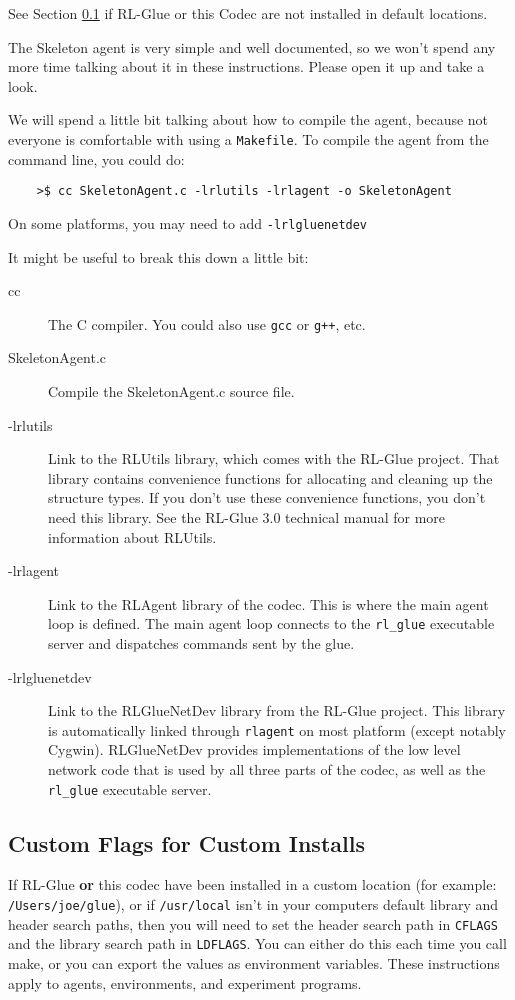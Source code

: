 \documentclass[11pt]{article}
\begin{document}
See Section \ref{sec:custom-flags} if RL-Glue or this Codec are not installed in default locations.

The Skeleton agent is very simple and well documented, so we won't spend any more time talking about it in these instructions.
Please open it up and take a look.

We will spend a little bit talking about how to compile the agent, because not everyone is comfortable with using a \texttt{Makefile}.  To compile
the agent from the command line, you could do:
\begin{verbatim}
	>$ cc SkeletonAgent.c -lrlutils -lrlagent -o SkeletonAgent
\end{verbatim}

On some platforms, you may need to add \texttt{-lrlgluenetdev}

It might be useful to break this down a little bit:
\begin{description}
\item [cc] The C compiler.  You could also use \texttt{gcc} or \texttt{g++}, etc.
\item [SkeletonAgent.c] Compile the SkeletonAgent.c source file.
\item [-lrlutils] Link to the RLUtils library, which comes with the RL-Glue project.  That library contains convenience functions for allocating and cleaning up the structure types.  If you 
don't use these convenience functions, you don't need this library.  See the RL-Glue 3.0 technical manual for more information about RLUtils.
\item [-lrlagent] Link to the RLAgent library of the codec.  This is where the main agent loop is defined. The main agent loop connects to the \texttt{rl\_glue} executable server and dispatches commands sent by the glue.
\item [-lrlgluenetdev] Link to the RLGlueNetDev library from the RL-Glue project.  This library is automatically linked through \texttt{rlagent} on most platform (except notably Cygwin).  
RLGlueNetDev provides implementations of the low level network code that is used by all three parts of the codec, as well as the \texttt{rl\_glue} executable server.
\end{description}

\subsection{Custom Flags for Custom Installs}
\label{sec:custom-flags}
If RL-Glue \textbf{or} this codec have been installed in a custom location (for example: \texttt{/Users/joe/glue}), or if \texttt{/usr/local} isn't in your computers default library and header search paths, then you will
need to set the header search path in \texttt{CFLAGS} and the library search path in \texttt{LDFLAGS}.  You can either do this each time you call make, 
or you can export the values as environment variables.  These instructions apply to agents, environments, and experiment programs.
\end{document}
